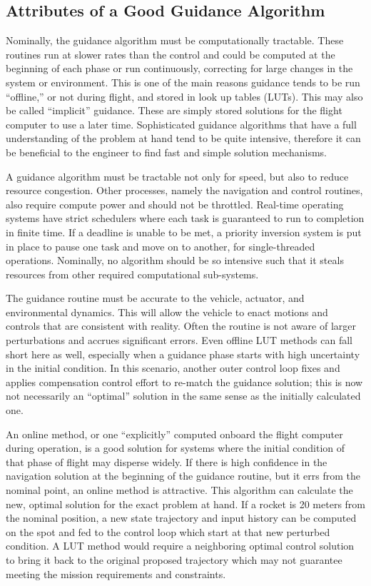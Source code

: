 \subsection{Attributes of a Good Guidance Algorithm}
Nominally, the guidance algorithm must be computationally tractable. These routines run at slower rates than the control and could be computed at the beginning of each phase or run continuously, correcting for large changes in the system or environment.
This is one of the main reasons guidance tends to be run ``offline,'' or not during flight, and stored in look up tables (LUTs). This may also be called ``implicit'' guidance. These are simply stored solutions for the flight computer to use a later time. Sophisticated guidance algorithms that have a full understanding of the problem at hand tend to be quite intensive, therefore it can be beneficial to the engineer to find fast and simple solution mechanisms.

A guidance algorithm must be tractable not only for speed, but also to reduce resource congestion. Other processes, namely the navigation and control routines, also require compute power and should not be throttled. Real-time operating systems have strict schedulers where each task is guaranteed to run to completion in finite time. If a deadline is unable to be met, a priority inversion system is put in place to pause one task and move on to another, for single-threaded operations. Nominally, no algorithm should be so intensive such that it steals resources from other required computational sub-systems.

The guidance routine must be accurate to the vehicle, actuator, and environmental dynamics. This will allow the vehicle to enact motions and controls that are consistent with reality. Often the routine is not aware of larger perturbations and accrues significant errors. Even offline LUT methods can fall short here as well, especially when a guidance phase starts with high uncertainty in the initial condition. In this scenario, another outer control loop fixes and applies compensation control effort to re-match the guidance solution; this is now not necessarily an ``optimal'' solution in the same sense as the initially calculated one.

An online method, or one ``explicitly'' computed onboard the flight computer during operation, is a good solution for systems where the initial condition of that phase of flight may disperse widely. If there is high confidence in the navigation solution at the beginning of the guidance routine, but it errs from the nominal point, an online method is attractive. This algorithm can calculate the new, optimal solution for the exact problem at hand. If a rocket is 20 meters from the nominal position, a new state trajectory and input history can be computed on the spot and fed to the control loop which start at that new perturbed condition. A LUT method would require a neighboring optimal control solution to bring it back to the original proposed trajectory which may not guarantee meeting the mission requirements and constraints.

